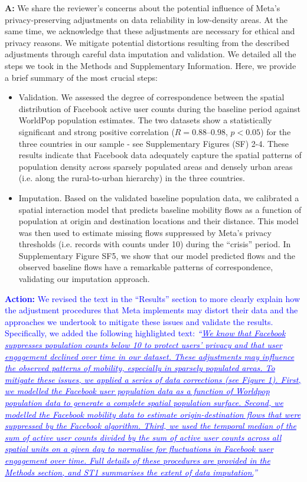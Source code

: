 \documentclass[12pt,a4paper,oneside, reqno]{amsart}
\begin{document}
\setlength{\leftskip}{1cm}\textbf{A:} We share the reviewer’s concerns about the potential influence of Meta’s privacy-preserving adjustments on data reliability in low-density areas. At the same time, we acknowledge that these adjustments are necessary for ethical and privacy reasons. We mitigate potential distortions resulting from the described adjustments through careful data imputation and validation. We detailed all the steps we took in the Methods and Supplementary Information. Here, we provide a brief summary of the most crucial steps:
\begin{itemize}[noitemsep, topsep=0pt]
    \item Validation. We assessed the degree of correspondence between the spatial distribution of Facebook active user counts during the baseline period against WorldPop population estimates. The two datasets show a statistically significant and strong positive correlation ($R = 0.88–0.98$, $p<0.05$) for the three countries in our sample - see Supplementary Figures (SF) 2-4. These results indicate that Facebook data adequately capture the spatial patterns of population density across sparsely populated areas and densely urban areas (i.e. along the rural-to-urban hierarchy) in the three countries. 
    \item Imputation. Based on the validated baseline population data, we calibrated a spatial interaction model that predicts baseline mobility flows as a function of population at origin and destination locations and their distance. This model was then used to estimate missing flows suppressed by Meta’s privacy thresholds (i.e. records with counts under 10) during the ``crisis'' period. In Supplementary Figure SF5, we show that our model predicted flows and the observed baseline flows have a remarkable patterns of correspondence, validating our imputation approach.
\end{itemize}

\setlength{\leftskip}{1cm}\textcolor{blue}{\textbf{Action:} We revised the text in the ``Results'' section to more clearly explain how the adjustment procedures that Meta implements may distort their data and the approaches we undertook to mitigate these issues and validate the results. Specifically, we added the following highlighted text: \textit{``\uline{We know that Facebook suppresses population counts below 10 to protect users' privacy and that user engagement declined over time in our dataset. These adjustments may influence the observed patterns of mobility, especially in sparsely populated areas. To mitigate these issues, we applied a series of data corrections (see Figure 1). First, we modelled the Facebook user population data as a function of Worldpop population data to
generate a complete spatial population surface. Second, we modelled the Facebook mobility data to estimate origin-destination
flows that were suppressed by the Facebook algorithm. Third, we used the temporal median of the sum of active user counts
divided by the sum of active user counts across all spatial units on a given day to normalise for fluctuations in Facebook user engagement over time. Full details of these procedures are provided in the Methods section, and ST1 summarises the extent of
data imputation.}''}}
\end{document}
